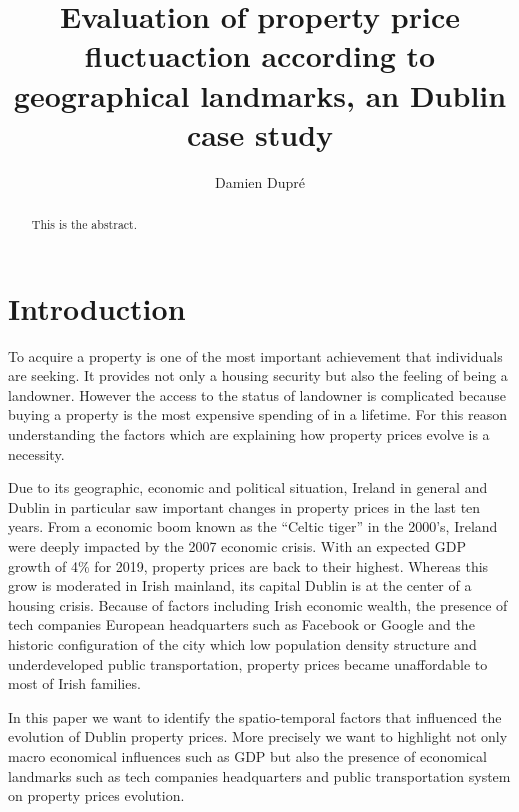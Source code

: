 \documentclass[]{elsarticle} %
\begin{document}
\begin{frontmatter}

  \title{Evaluation of property price fluctuaction according to geographical
landmarks, an Dublin case study}
    \author[Dublin City University]{Damien Dupré}
      \address[Dublin City University]{Business School, Glasnevin, Dublin 9, Ireland}
  
  \begin{abstract}
  This is the abstract.
  \end{abstract}
  
 \end{frontmatter}

\section{Introduction}\label{introduction}

To acquire a property is one of the most important achievement that
individuals are seeking. It provides not only a housing security but
also the feeling of being a landowner. However the access to the status
of landowner is complicated because buying a property is the most
expensive spending of in a lifetime. For this reason understanding the
factors which are explaining how property prices evolve is a necessity.

Due to its geographic, economic and political situation, Ireland in
general and Dublin in particular saw important changes in property
prices in the last ten years. From a economic boom known as the ``Celtic
tiger'' in the 2000's, Ireland were deeply impacted by the 2007 economic
crisis. With an expected GDP growth of 4\% for 2019, property prices are
back to their highest. Whereas this grow is moderated in Irish mainland,
its capital Dublin is at the center of a housing crisis. Because of
factors including Irish economic wealth, the presence of tech companies
European headquarters such as Facebook or Google and the historic
configuration of the city which low population density structure and
underdeveloped public transportation, property prices became
unaffordable to most of Irish families.

In this paper we want to identify the spatio-temporal factors that
influenced the evolution of Dublin property prices. More precisely we
want to highlight not only macro economical influences such as GDP but
also the presence of economical landmarks such as tech companies
headquarters and public transportation system on property prices
evolution.
\end{document}
